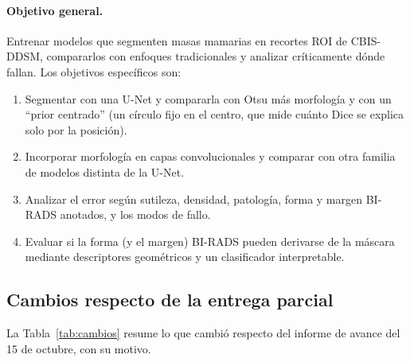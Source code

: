 \documentclass[11pt,a4paper]{article}
\begin{document}
\paragraph{Objetivo general.} Entrenar modelos que segmenten masas mamarias en recortes ROI de CBIS-DDSM, compararlos con enfoques tradicionales y analizar críticamente dónde fallan. Los objetivos específicos son:
\begin{enumerate}
\item[\textbf{O1.}] Segmentar con una U-Net y compararla con Otsu más morfología y con un ``prior centrado'' (un círculo fijo en el centro, que mide cuánto Dice se explica solo por la posición).
\item[\textbf{O2.}] Incorporar morfología en capas convolucionales y comparar con otra familia de modelos distinta de la U-Net.
\item[\textbf{O3.}] Analizar el error según sutileza, densidad, patología, forma y margen BI-RADS anotados, y los modos de fallo.
\item[\textbf{O4.}] Evaluar si la forma (y el margen) BI-RADS pueden derivarse de la máscara mediante descriptores geométricos y un clasificador interpretable.
\end{enumerate}

\subsection{Cambios respecto de la entrega parcial}
La Tabla~\ref{tab:cambios} resume lo que cambió respecto del informe de avance del 15 de octubre, con su motivo.
\end{document}
